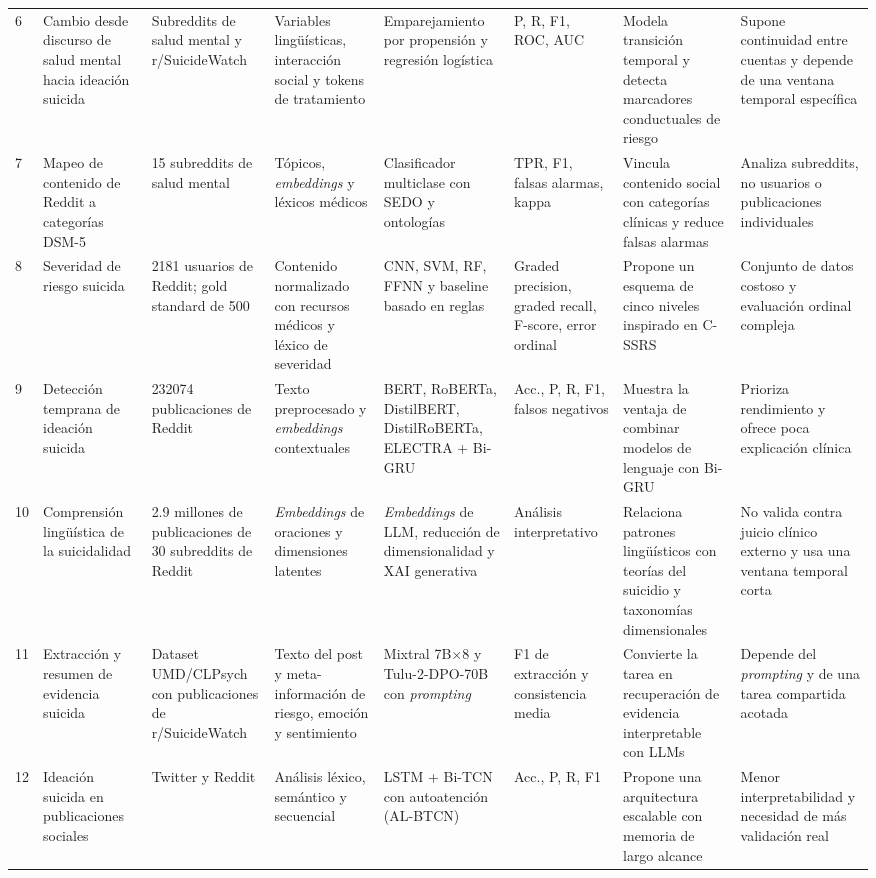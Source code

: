 \begin{table}[!t]
\begin{adjustbox}{max width=\textwidth}
\begin{tabular}{P{0.05\textwidth} P{0.11\textwidth} P{0.12\textwidth} P{0.13\textwidth} P{0.12\textwidth} P{0.08\textwidth} P{0.19\textwidth} P{0.17\textwidth}}
6 & Cambio desde discurso de salud mental hacia ideación suicida & Subreddits de salud mental y r/SuicideWatch & Variables lingüísticas, interacción social y tokens de tratamiento & Emparejamiento por propensión y regresión logística & P, R, F1, ROC, AUC & Modela transición temporal y detecta marcadores conductuales de riesgo & Supone continuidad entre cuentas y depende de una ventana temporal específica \\
7 & Mapeo de contenido de Reddit a categorías DSM-5 & 15 subreddits de salud mental & Tópicos, \textit{embeddings} y léxicos médicos & Clasificador multiclase con SEDO y ontologías & TPR, F1, falsas alarmas, kappa & Vincula contenido social con categorías clínicas y reduce falsas alarmas & Analiza subreddits, no usuarios o publicaciones individuales \\
8 & Severidad de riesgo suicida & 2181 usuarios de Reddit; gold standard de 500 & Contenido normalizado con recursos médicos y léxico de severidad & CNN, SVM, RF, FFNN y baseline basado en reglas & Graded precision, graded recall, F-score, error ordinal & Propone un esquema de cinco niveles inspirado en C-SSRS & Conjunto de datos costoso y evaluación ordinal compleja \\
9 & Detección temprana de ideación suicida & 232074 publicaciones de Reddit & Texto preprocesado y \textit{embeddings} contextuales & BERT, RoBERTa, DistilBERT, DistilRoBERTa, ELECTRA + Bi-GRU & Acc., P, R, F1, falsos negativos & Muestra la ventaja de combinar modelos de lenguaje con Bi-GRU & Prioriza rendimiento y ofrece poca explicación clínica \\
10 & Comprensión lingüística de la suicidalidad & 2.9 millones de publicaciones de 30 subreddits de Reddit & \textit{Embeddings} de oraciones y dimensiones latentes & \textit{Embeddings} de LLM, reducción de dimensionalidad y XAI generativa & Análisis interpretativo & Relaciona patrones lingüísticos con teorías del suicidio y taxonomías dimensionales & No valida contra juicio clínico externo y usa una ventana temporal corta \\
11 & Extracción y resumen de evidencia suicida & Dataset UMD/CLPsych con publicaciones de r/SuicideWatch & Texto del post y meta-información de riesgo, emoción y sentimiento & Mixtral 7B$\times$8 y Tulu-2-DPO-70B con \textit{prompting} & F1 de extracción y consistencia media & Convierte la tarea en recuperación de evidencia interpretable con LLMs & Depende del \textit{prompting} y de una tarea compartida acotada \\
12 & Ideación suicida en publicaciones sociales & Twitter y Reddit & Análisis léxico, semántico y secuencial & LSTM + Bi-TCN con autoatención (AL-BTCN) & Acc., P, R, F1 & Propone una arquitectura escalable con memoria de largo alcance & Menor interpretabilidad y necesidad de más validación real \\

\end{tabular}
\end{adjustbox}
\end{table}
